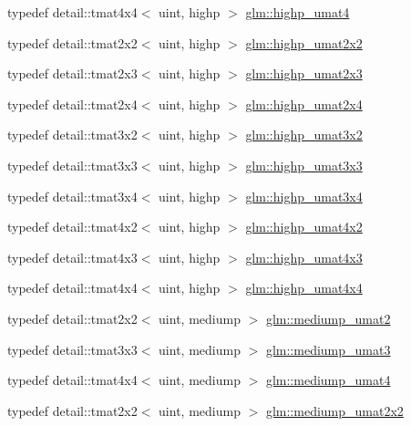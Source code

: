 \begin{DoxyCompactItemize}
\item 
typedef detail\+::tmat4x4$<$ uint, highp $>$ \hyperlink{group__gtc__matrix__integer_gaf12f0d2744e809e64469d27ef392aa98}{glm\+::highp\+\_\+umat4}
\item 
typedef detail\+::tmat2x2$<$ uint, highp $>$ \hyperlink{group__gtc__matrix__integer_ga428410468e33d16dc8aee08b17166669}{glm\+::highp\+\_\+umat2x2}
\item 
typedef detail\+::tmat2x3$<$ uint, highp $>$ \hyperlink{group__gtc__matrix__integer_ga309076d055b5511a7071ebb5f660ed83}{glm\+::highp\+\_\+umat2x3}
\item 
typedef detail\+::tmat2x4$<$ uint, highp $>$ \hyperlink{group__gtc__matrix__integer_gabe8572c228aecc0bfa7ba92415b1c651}{glm\+::highp\+\_\+umat2x4}
\item 
typedef detail\+::tmat3x2$<$ uint, highp $>$ \hyperlink{group__gtc__matrix__integer_ga6f6a73ec605a515fb21d779663082ef9}{glm\+::highp\+\_\+umat3x2}
\item 
typedef detail\+::tmat3x3$<$ uint, highp $>$ \hyperlink{group__gtc__matrix__integer_ga8dd9f8bfe06de34c8f1a942d2c2e094c}{glm\+::highp\+\_\+umat3x3}
\item 
typedef detail\+::tmat3x4$<$ uint, highp $>$ \hyperlink{group__gtc__matrix__integer_gabaeb2363acd07cc7f99918bae48ccc05}{glm\+::highp\+\_\+umat3x4}
\item 
typedef detail\+::tmat4x2$<$ uint, highp $>$ \hyperlink{group__gtc__matrix__integer_ga32442efcb778cb80024a17bafa781f81}{glm\+::highp\+\_\+umat4x2}
\item 
typedef detail\+::tmat4x3$<$ uint, highp $>$ \hyperlink{group__gtc__matrix__integer_ga763a36c57b6073ca3cac739bfbe794ba}{glm\+::highp\+\_\+umat4x3}
\item 
typedef detail\+::tmat4x4$<$ uint, highp $>$ \hyperlink{group__gtc__matrix__integer_gaa14b7029cfaf6f26384782f5ff7acddf}{glm\+::highp\+\_\+umat4x4}
\item 
typedef detail\+::tmat2x2$<$ uint, mediump $>$ \hyperlink{group__gtc__matrix__integer_ga388a5b9d7e494d5f5bd30b9e11ded06a}{glm\+::mediump\+\_\+umat2}
\item 
typedef detail\+::tmat3x3$<$ uint, mediump $>$ \hyperlink{group__gtc__matrix__integer_ga123f7d8bac8849e3a150bdf8a21e44a2}{glm\+::mediump\+\_\+umat3}
\item 
typedef detail\+::tmat4x4$<$ uint, mediump $>$ \hyperlink{group__gtc__matrix__integer_gac82f1c426fbca1c4989f0985eb7a4358}{glm\+::mediump\+\_\+umat4}
\item 
typedef detail\+::tmat2x2$<$ uint, mediump $>$ \hyperlink{group__gtc__matrix__integer_ga80e478f09c6caa16410198ce78fe8a2b}{glm\+::mediump\+\_\+umat2x2}

\end{DoxyCompactItemize}
